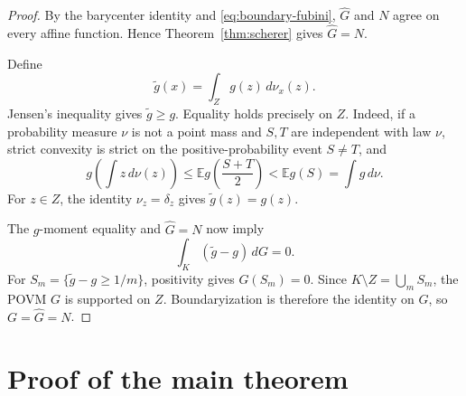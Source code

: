 \documentclass[11pt,a4paper]{amsart}
\theoremstyle{remark}
\begin{document}
\begin{proof}
By the barycenter identity and \eqref{eq:boundary-fubini},
\(\widehat G\) and \(N\) agree on every affine function.  Hence
Theorem~\ref{thm:scherer} gives \(\widehat G=N\).

Define
\[
 \widetilde g(x)=\int_Zg(z)\,d\nu_x(z).
\]
Jensen's inequality gives \(\widetilde g\geq g\).  Equality holds precisely
on \(Z\).  Indeed, if a probability measure \(\nu\) is not a point mass and
\(S,T\) are independent with law \(\nu\), strict convexity is strict on the
positive-probability event \(S\neq T\), and
\[
 g\!\left(\int z\,d\nu(z)\right)
 \leq\mathbb E g\!\left(\frac{S+T}{2}\right)
 <\mathbb E g(S)=\int g\,d\nu.
\]
For \(z\in Z\), the identity \(\nu_z=\delta_z\) gives
\(\widetilde g(z)=g(z)\).

The \(g\)-moment equality and \(\widehat G=N\) now imply
\[
 \int_K(\widetilde g-g)\,dG=0.
\]
For \(S_m=\{\widetilde g-g\geq1/m\}\), positivity gives \(G(S_m)=0\).
Since \(K\setminus Z=\bigcup_mS_m\), the POVM \(G\) is supported on \(Z\).
Boundaryization is therefore the identity on \(G\), so
\(G=\widehat G=N\).
\end{proof}

\section{Proof of the main theorem}
\end{document}

